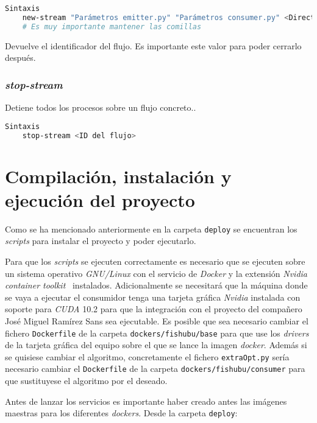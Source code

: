 \begin{lstlisting}[language=Bash]
Sintaxis
	new-stream "Parámetros emitter.py" "Parámetros consumer.py" <Directorio de salida>
	# Es muy importante mantener las comillas
\end{lstlisting}

Devuelve el identificador del flujo. Es importante este valor para poder cerrarlo después.

\subsubsection{\textit{stop-stream}}
Detiene todos los procesos sobre un flujo concreto..

\begin{lstlisting}[language=Bash]
Sintaxis
	stop-stream <ID del flujo>
\end{lstlisting}

\section{Compilación, instalación y ejecución del proyecto}

Como se ha mencionado anteriormente en la carpeta \texttt{deploy} se encuentran los \textit{scripts} para instalar el proyecto y poder ejecutarlo.

Para que los \textit{scripts} se ejecuten correctamente es necesario que se ejecuten sobre un sistema operativo \textit{GNU/Linux} con el servicio de \textit{Docker} y la extensión \textit{Nvidia container toolkit}~\cite{toolkitnvidiadocker} instalados. Adicionalmente se necesitará que la máquina donde se vaya a ejecutar el consumidor tenga una tarjeta gráfica \textit{Nvidia} instalada con soporte para \textit{CUDA} 10.2 para que la integración con el proyecto del compañero José Miguel Ramírez Sans sea ejecutable. Es posible que sea necesario cambiar el fichero \texttt{Dockerfile} de la carpeta \texttt{dockers/fishubu/base} para que use los \textit{drivers} de la tarjeta gráfica del equipo sobre el que se lance la imagen \textit{docker}. Además si se quisiese cambiar el algoritmo, concretamente el fichero \texttt{extraOpt.py} sería necesario cambiar el \texttt{Dockerfile} de la carpeta \texttt{dockers/fishubu/consumer} para que sustituyese el algoritmo por el deseado.

Antes de lanzar los servicios es importante haber creado antes las imágenes maestras para los diferentes \textit{dockers}. Desde la carpeta \texttt{deploy}:

